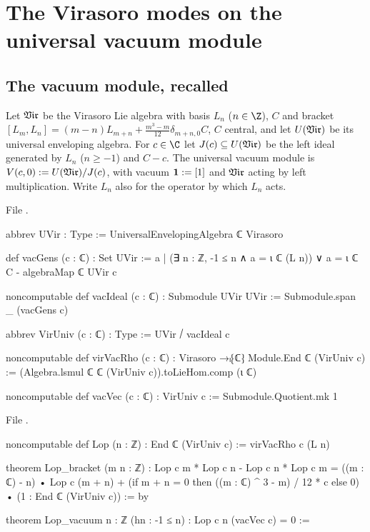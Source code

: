 \section{The Virasoro modes on the universal vacuum module}\label{l06:sec:modes}

\subsection{The vacuum module, recalled}

\begin{definition}\label{l06:def:Vc}
Let $\mathfrak{Vir}$ be the Virasoro Lie algebra with basis $L_n$ ($n\in\Z$), $C$ and bracket
$[L_m,L_n] = (m-n)L_{m+n}+\frac{m^3-m}{12}\delta_{m+n,0}C$, $C$ central, and let $U(\mathfrak{Vir})$ be its universal
enveloping algebra. For $c\in\C$ let $J(c)\subseteq U(\mathfrak{Vir})$ be the left ideal generated by $L_n$
($n\ge-1$) and $C-c$. The universal vacuum module is $V(c,0) := U(\mathfrak{Vir})/J(c)$, with vacuum
$\mathbf{1} := [1]$ and $\mathfrak{Vir}$ acting by left multiplication. Write $L_n$ also for the operator by
which $L_n$ acts.
\end{definition}

File .
\begin{leancode}
abbrev UVir : Type := UniversalEnvelopingAlgebra ℂ Virasoro

def vacGens (c : ℂ) : Set UVir :=
  {a | (∃ n : ℤ, -1 ≤ n ∧ a = ι ℂ (L n)) ∨ a = ι ℂ C - algebraMap ℂ UVir c}

noncomputable def vacIdeal (c : ℂ) : Submodule UVir UVir :=
  Submodule.span _ (vacGens c)

abbrev VirUniv (c : ℂ) : Type := UVir ⧸ vacIdeal c

noncomputable def virVacRho (c : ℂ) : Virasoro →ₗ⁅ℂ⁆ Module.End ℂ (VirUniv c) :=
  (Algebra.lsmul ℂ ℂ (VirUniv c)).toLieHom.comp (ι ℂ)

noncomputable def vacVec (c : ℂ) : VirUniv c := Submodule.Quotient.mk 1
\end{leancode}
File .
\begin{leancode}
noncomputable def Lop (n : ℤ) : End ℂ (VirUniv c) := virVacRho c (L n)

theorem Lop_bracket (m n : ℤ) :
    Lop c m * Lop c n - Lop c n * Lop c m
      = ((m : ℂ) - n) • Lop c (m + n)
        + (if m + n = 0 then ((m : ℂ) ^ 3 - m) / 12 * c else 0) • (1 : End ℂ (VirUniv c)) := by

theorem Lop_vacuum {n : ℤ} (hn : -1 ≤ n) : Lop c n (vacVec c) = 0 :=
\end{leancode}

